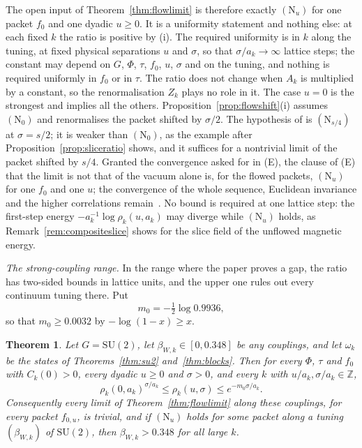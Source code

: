 \documentclass[aps,prd,twocolumn,superscriptaddress,nofootinbib,longbibliography,floatfix,amsmath,amssymb,10pt]{revtex4-2}
\newtheorem{theorem}{Theorem}
\theoremstyle{definition}
\theoremstyle{remark}
\newcommand{\Z}{\mathbb{Z}}
\newcommand{\SU}{\mathrm{SU}}
\begin{document}
The open input of Theorem~\ref{thm:flowlimit} is therefore exactly
$(\mathrm N_u)$ for one packet $f_0$ and one dyadic $u\ge0$. It is a uniformity
statement and nothing else: at each fixed $k$ the ratio is positive by (i).
The required uniformity is in $k$ along the tuning, at fixed physical
separations $u$ and $\sigma$, so that $\sigma/a_k\to\infty$ lattice steps;
the constant may depend on $G$, $\Phi$, $\tau$, $f_0$, $u$, $\sigma$ and on the
tuning, and nothing is required uniformly in $f_0$ or in $\tau$. The ratio
does not change when $A_k$ is multiplied by a constant, so the renormalisation
$Z_k$ plays no role in it. The case $u=0$ is the strongest and implies all the
others. Proposition~\ref{prop:flowshift}(i) assumes $(\mathrm N_0)$ and
renormalises the packet shifted by $\sigma/2$. The hypothesis of
\cite[Lemma~462]{BBLR26} is $(\mathrm N_{s/4})$ at $\sigma=s/2$; it is
weaker than $(\mathrm N_0)$, as the example after
Proposition~\ref{prop:sliceratio} shows, and it suffices for a nontrivial
limit of the packet shifted by $s/4$. Granted the convergence asked for in (E), the
clause of (E) that the limit is not that of the vacuum alone is, for the
flowed packets, $(\mathrm N_u)$ for one $f_0$ and one $u$; the convergence of
the whole sequence, Euclidean invariance and the higher correlations
remain~\cite{JW06}.
No bound is required at one lattice step: the first-step energy
$-a_k^{-1}\log\rho_k(u,a_k)$ may diverge while $(\mathrm N_u)$ holds, as
Remark~\ref{rem:compositeslice} shows for the slice field of the unflowed
magnetic energy.

\emph{The strong-coupling range.} In the range where the paper proves a
gap, the ratio has two-sided bounds in lattice units, and the upper one rules
out every continuum tuning there. Put
\[
m_0=-\tfrac12\log0.9936 ,
\]
so that $m_0\ge0.0032$ by $-\log(1-x)\ge x$.

\begin{theorem}\label{thm:strongratio}
Let $G=\SU(2)$, let $\beta_{W,k}\in[0,0.348]$ be any couplings, and let
$\omega_k$ be the states of Theorems~\ref{thm:su2} and~\ref{thm:blocks}. Then
for every $\Phi$, $\tau$ and $f_0$ with $C_k(0)>0$, every dyadic $u\ge0$ and
$\sigma>0$, and every $k$ with $u/a_k,\sigma/a_k\in\Z$,
\[
\rho_k(0,a_k)^{\sigma/a_k}\le\rho_k(u,\sigma)\le e^{-m_0\sigma/a_k} .
\]
Consequently every limit of Theorem~\textup{\ref{thm:flowlimit}} along these
couplings, for every packet $f_{0,u}$, is trivial, and if $(\mathrm N_u)$ holds
for some packet along a tuning $(\beta_{W,k})$ of $\SU(2)$, then
$\beta_{W,k}>0.348$ for all large $k$.
\end{theorem}
\end{document}
